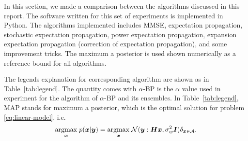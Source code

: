 \documentclass{article}
\begin{document}
In this section, we made a comparison between the algorithms discussed in this report. The software written for this set of experiments is implemented in Python. The algorithms implemented includes MMSE, expectation propagation, stochastic expectation propagation, power expectation propagation, expansion expectation propagation (correction of expectation propagation), and some improvement tricks. The maximum a posterior is used shown numerically as a reference bound for all algorithms.

The legends explanation for corresponding algorithm are shown as in Table~\ref{tab:legend}.
The quantity comes with $\alpha$-BP is the $\alpha$ value used in experiment for the algorithm of $\alpha$-BP and its ensembles. In Table~\ref{tab:legend}, MAP stands for maximum a posterior, which is the optimal solution for problem \eqref{eq:linear-model}, i.e.
\begin{equation}
  \underset{\bm{x}}{\operatorname{argmax}}\;p(\bm{x}|\bm{y}) =\underset{\bm{x}}{\operatorname{argmax}}\; \mathcal{N}(\bm{y}: \bm{H}\bm{x}, \sigma_{w}^2\bm{I})\delta_{\bm{x}\in \mathcal{A}}.
\end{equation}




\newpage




\end{document}
